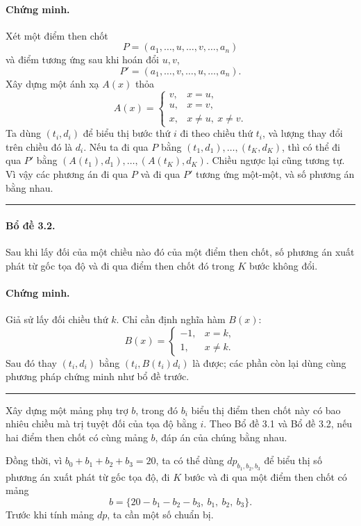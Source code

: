\documentclass[11pt]{article}
\newcommand{\qedmark}{\hfill\rule{0.7ex}{0.7ex}}
\begin{document}
\paragraph{Chứng minh.}
Xét một điểm then chốt
\[
  P=(a_1,\ldots,u,\ldots,v,\ldots,a_n)
\]
và điểm tương ứng sau khi hoán đổi \(u,v\),
\[
  P'=(a_1,\ldots,v,\ldots,u,\ldots,a_n).
\]
Xây dựng một ánh xạ \(A(x)\) thỏa
\[
  A(x)=
  \begin{cases}
    v, & x=u,\\
    u, & x=v,\\
    x, & x\ne u,\ x\ne v.
  \end{cases}
\]
Ta dùng \((t_i,d_i)\) để biểu thị bước thứ \(i\) đi theo chiều thứ \(t_i\), và
lượng thay đổi trên chiều đó là \(d_i\). Nếu ta đi qua \(P\) bằng
\((t_1,d_1),\ldots,(t_K,d_K)\), thì có thể đi qua \(P'\) bằng
\((A(t_1),d_1),\ldots,(A(t_K),d_K)\). Chiều ngược lại cũng tương tự. Vì vậy các
phương án đi qua \(P\) và đi qua \(P'\) tương ứng một-một, và số phương án bằng
nhau. \qedmark

\paragraph{Bổ đề 3.2.}
Sau khi lấy đối của một chiều nào đó của một điểm then chốt, số phương án xuất
phát từ gốc tọa độ và đi qua điểm then chốt đó trong \(K\) bước không đổi.

\paragraph{Chứng minh.}
Giả sử lấy đối chiều thứ \(k\). Chỉ cần định nghĩa hàm \(B(x)\):
\[
  B(x)=
  \begin{cases}
    -1, & x=k,\\
    1, & x\ne k.
  \end{cases}
\]
Sau đó thay \((t_i,d_i)\) bằng \((t_i,B(t_i)d_i)\) là được; các phần còn lại
dùng cùng phương pháp chứng minh như bổ đề trước. \qedmark

Xây dựng một mảng phụ trợ \(b\), trong đó \(b_i\) biểu thị điểm then chốt này
có bao nhiêu chiều mà trị tuyệt đối của tọa độ bằng \(i\). Theo Bổ đề 3.1 và
Bổ đề 3.2, nếu hai điểm then chốt có cùng mảng \(b\), đáp án của chúng bằng
nhau.

Đồng thời, vì \(b_0+b_1+b_2+b_3=20\), ta có thể dùng
\(dp_{b_1,b_2,b_3}\) để biểu thị số phương án xuất phát từ gốc tọa độ, đi
\(K\) bước và đi qua một điểm then chốt có mảng
\[
  b=\{20-b_1-b_2-b_3,\ b_1,\ b_2,\ b_3\}.
\]
Trước khi tính mảng \(dp\), ta cần một số chuẩn bị.
\end{document}

